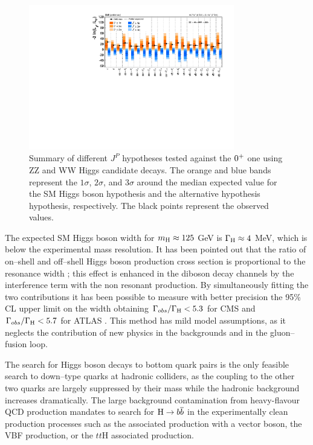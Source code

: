 \begin{figure}
        \centering
	\includegraphics[width=0.8\textwidth]{1_Introduction_Th_and_Exp/pics/hwwhzz_JP_SummaryPlot.pdf}
       \caption{Summary of different $J^P$ hypotheses tested against the $0^{+}$ one using ZZ and WW Higgs candidate decays. The orange and blue bands represent the $1\sigma$, $2\sigma$, and $3\sigma$ around the median expected value for the SM Higgs boson hypothesis and the alternative hypothesis hypothesis, respectively. The black points represent the observed values. }
       \label{fig:hjp}
\end{figure}

The expected SM Higgs boson width for $m_{\mathrm{H}} \approx 125$ GeV is $\Gamma_{\mathrm{H}} \approx 4$ MeV, which is below the experimental mass resolution. It has been pointed out that the ratio of on--shell and off--shell Higgs boson production cross section is proportional to the resonance width \cite{Caola:2013yja}; this effect is enhanced in the diboson decay channels by the interference term with the non resonant production. By simultaneously fitting the two contributions it has been possible to measure with better precision the 95\% CL upper limit on the width obtaining $\Gamma_{obs} / \Gamma_{\mathrm{H}} < 5.3$ for CMS \cite{Khachatryan:2014iha} and $\Gamma_{obs} / \Gamma_{\mathrm{H}} < 5.7$ for ATLAS \cite{ATLASCONF:2014042}. This method has mild model assumptions, as it neglects the contribution of new physics in the backgrounds and in the gluon--fusion loop. 

The search for Higgs boson decays to bottom quark pairs is the only feasible search to down--type quarks at hadronic colliders, as the coupling to the other two quarks are largely suppressed by their mass while the hadronic background increases dramatically. The large background contamination from heavy-flavour QCD production mandates to search for $\mathrm{H}\rightarrow b\overline{b}$ in the experimentally clean production processes such as the associated production with a vector boson, the VBF production, or the $tt$H associated production.

